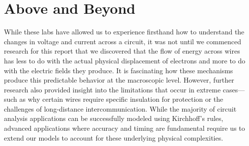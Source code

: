 \documentclass[12pt]{article}
\begin{document}
\section{Above and Beyond}
While these labs have allowed us to experience firsthand how to understand the
changes in voltage and current across a circuit, it was not until we commenced
research for this report that we discovered that
the flow of energy across wires
has less to do with the actual physical displacement of electrons and more to do
with the electric fields they produce. It is fascinating how these mechanisms
produce this predictable behavior at the macroscopic level. However, further
research also provided insight into the limitations that occur in extreme
cases—such as why certain wires require specific insulation for protection or
the challenges of long-distance intercommunication. While the majority of
circuit analysis applications can be successfully modeled using Kirchhoff's
rules, advanced applications where accuracy and timing are fundamental require
us to extend our models to account for these underlying physical complexities.
\end{document}
